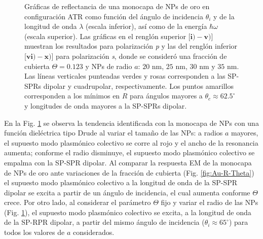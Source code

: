 \begin{figure}[t!]
\vspace*{-.5em}
	\caption{Gráficas de reflectancia de una monocapa de NPs de oro en configuración ATR como función del ángulo de incidencia $\theta_i$ y de la longitud de onda $\lambda$ (escala inferior), así como de la energía  $\hbar\omega$ (escala superior).  Las gráficas   en el renglón superior [$\mathbf{i)-v)}$] muestran los resultados para  polarización \emph{p} y las del renglón inferior  [$\mathbf{vi)-x)}$]  para polarización  \emph{s}, donde se consideró una fracción de cubierta $\Theta = 0.123$ y  NPs de radio  $a$: $20$ nm, $25$ nm, $30$ nm y $35$ nm.  Las líneas verticales punteadas verdes y rosas corresponden a las SP-SPRs dipolar y  cuadrupolar, respectivamente.  Los puntos amarillos corresponden a los mínimos en $R$ para ángulos mayores a $\theta_c\approx 62.5^\circ$ y longitudes de onda mayores a la SP-SPRs dipolar.
}	\label{fig:Au-R-Rad}	
	\end{figure}	


En la Fig. \ref{fig:Au-R-Rad} se observa la tendencia identificada con la monocapa de NPs con una función dieléctrica tipo Drude al variar el tamaño de las NPs: a radios $a$ mayores, el supuesto modo plasmónico colectivo se corre al rojo y el ancho de la resonancia aumenta; conforme el radio disminuye, el supuesto modo plasmónico colectivo se empalma con la SP-SPR dipolar. Al comparar la respuesta EM de la monocapa de NPs de oro ante variaciones de la fracción de cubierta (Fig. \ref{fig:Au-R-Theta})  el supuesto modo plasmónico colectivo a la longitud de onda de la SP-SPR dipolar se excita a partir de un ángulo de incidencia, el cual aumenta conforme $\Theta$ crece. Por otro lado, al considerar el parámetro $\Theta$ fijo y variar el radio de las NPs (Fig. \ref{fig:Au-R-Rad}), el supuesto modo plasmónico colectivo se excita, a la longitud de onda de la SP-RPR dipolar,  a partir del mismo ángulo de incidencia ($\theta_i\approx 65^\circ$) para todos los valores de $a$ considerados.

